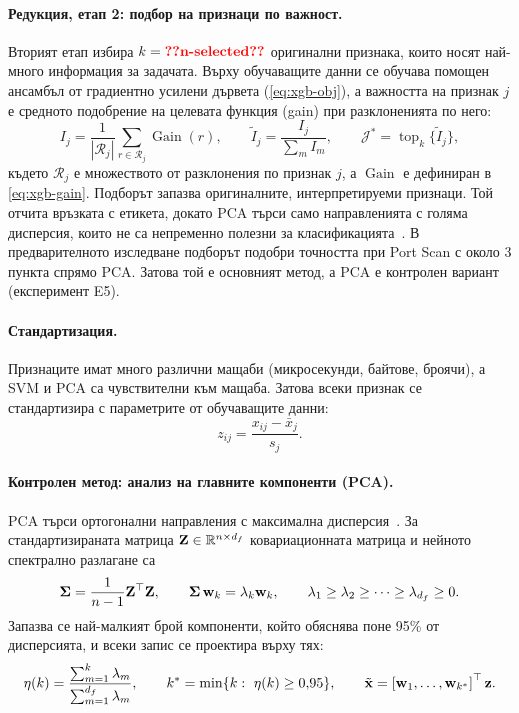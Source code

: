 \paragraph{Редукция, етап 2: подбор на признаци по важност.} Вторият етап избира $k=\val{n-selected}$ оригинални признака, които носят най-много информация за задачата. Върху обучаващите данни се обучава помощен ансамбъл от градиентно усилени дървета (\cref{eq:xgb-obj}), а важността на признак $j$ е средното подобрение на целевата функция (gain) при разклоненията по него:
\begin{equation}\label{eq:gain-imp}
I_j=\frac{1}{|\mathcal{R}_j|}\sum_{r\in\mathcal{R}_j}\operatorname{Gain}(r),\qquad \tilde I_j=\frac{I_j}{\sum_{m}I_m},\qquad \mathcal{J}^{*}=\operatorname{top}_k\bigl\{\tilde I_j\bigr\},
\end{equation}
където $\mathcal{R}_j$ е множеството от разклонения по признак $j$, а $\operatorname{Gain}$ е дефиниран в \cref{eq:xgb-gain}. Подборът запазва оригиналните, интерпретируеми признаци. Той отчита връзката с етикета, докато PCA търси само направленията с голяма дисперсия, които не са непременно полезни за класификацията~\cite{guyon2003}. В предварителното изследване подборът подобри точността при Port Scan с около 3 пункта спрямо PCA. Затова той е основният метод, а PCA е контролен вариант (експеримент E5).

\paragraph{Стандартизация.} Признаците имат много различни мащаби (микросекунди, байтове, броячи), а SVM и PCA са чувствителни към мащаба. Затова всеки признак се стандартизира с параметрите от обучаващите данни:
\begin{equation}\label{eq:zscore}
z_{ij}=\frac{x_{ij}-\bar{x}_j}{s_j}.
\end{equation}

\paragraph{Контролен метод: анализ на главните компоненти (PCA).} PCA търси ортогонални направления с максимална дисперсия~\cite{jolliffe2016}. За стандартизираната матрица $\mathbf{Z}\in\mathbb{R}^{n\times d_f}$ ковариационната матрица и нейното спектрално разлагане са
\begin{equation}\label{eq:cov}
\bm{\Sigma}=\frac{1}{n-1}\mathbf{Z}^{\top}\mathbf{Z},\qquad \bm{\Sigma}\,\mathbf{w}_k=\lambda_k\mathbf{w}_k,\qquad \lambda_1\ge\lambda_2\ge\dots\ge\lambda_{d_f}\ge 0.
\end{equation}
Запазва се най-малкият брой компоненти, който обяснява поне 95\% от дисперсията, и всеки запис се проектира върху тях:
\begin{equation}\label{eq:kstar}
\eta(k)=\frac{\sum_{m=1}^{k}\lambda_m}{\sum_{m=1}^{d_f}\lambda_m},\qquad k^{*}=\min\{k:\ \eta(k)\ge 0{,}95\},\qquad \tilde{\mathbf{x}}=\left[\mathbf{w}_1,\dots,\mathbf{w}_{k^*}\right]^{\top}\mathbf{z}.
\end{equation}

